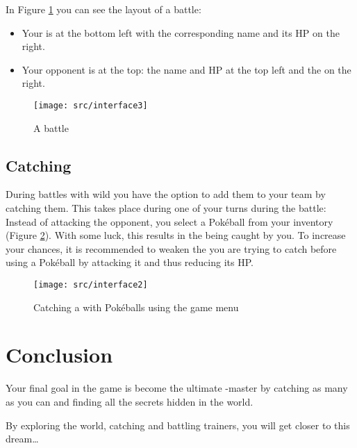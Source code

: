 In Figure \ref{battle} you can see the layout of a battle:
\begin{itemize}
\item Your \poke{} is at the bottom left with the corresponding name and its HP on the right.
\item Your opponent is at the top: the name and HP at the top left and the \poke{} on the right.
\end{itemize}

\begin{figure}[!ht]
\begin{center}
\texttt{[image: src/interface3]}
\end{center}
\caption[A \pokeT{} battle]{A \poke{} battle}
\label{battle}
\end{figure}

\newpage

\subsection[Catching \pokeT{}]{Catching \poke{}}
During battles with wild \poke{} you have the option to add them to your team by catching them. This takes place during one of your turns during the battle: Instead of attacking the opponent, you select a Pokéball from your inventory (Figure \ref{catching}). With some luck, this results in the \poke{} being caught by you. To increase your chances, it is recommended to weaken the \poke{} you are trying to catch before using a Pokéball by attacking it and thus reducing its HP.

\begin{figure}[!ht]
\begin{center}
\texttt{[image: src/interface2]}
\end{center}
\caption[Catching a \pokeT{} with Pokéballs using the game menu]{Catching a \poke{} with Pokéballs using the game menu}
\label{catching}
\end{figure}

\section{Conclusion}

Your final goal in the game is become the ultimate \poke{}-master by catching as many \poke{} as you can and finding all the secrets hidden in the world.

By exploring the \poke{} world, catching \poke{} and battling trainers, you will get closer to this dream…

